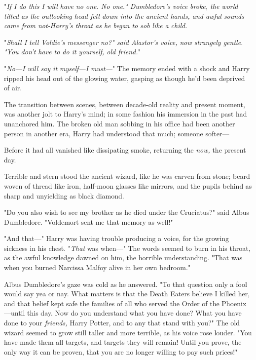 "\emph{If I do this I will have no one. No one." Dumbledore's voice broke, the 
world tilted as the outlooking head fell down into the ancient hands, and awful 
sounds came from not-Harry's throat as he began to sob like a child.}

"\emph{Shall I tell Voldie's messenger no?" said Alastor's voice, now strangely 
gentle. "You don't have to do it yourself, old friend.}"

"\emph{No---I will say it myself---I must---}"
\sbreak
The memory ended with a shock and Harry ripped his head out of the glowing 
water, gasping as though he'd been deprived of air.

The transition between scenes, between decade-old reality and present moment, 
was another jolt to Harry's mind; in some fashion his immersion in the past had 
unanchored him. The broken old man sobbing in his office had been another 
person in another era, Harry had understood that much; someone softer---

Before it had all vanished like dissipating smoke, returning the \emph{now,} 
the present day.

Terrible and stern stood the ancient wizard, like he was carven from stone; 
beard woven of thread like iron, half-moon glasses like mirrors, and the pupils 
behind as sharp and unyielding as black diamond.

"Do you also wish to see my brother as he died under the Cruciatus?" said Albus 
Dumbledore. "Voldemort sent me that memory as well!"

"And that---" Harry was having trouble producing a voice, for the growing 
sickness in his chest. "\emph{That} was when---" The words seemed to burn in 
his throat, as the awful knowledge dawned on him, the horrible understanding. 
"That was when you burned Narcissa Malfoy alive in her own bedroom."

Albus Dumbledore's gaze was cold as he answered. "To that question only a fool 
would say yea or nay. What matters is that the Death Eaters believe I killed 
her, and that belief kept safe the families of all who served the Order of the 
Phoenix---until this day. Now do you understand what you have done? What you 
have done to your \emph{friends,} Harry Potter, and to any that stand with 
you?" The old wizard seemed to grow still taller and more terrible, as his 
voice rose louder. "You have made them all targets, and targets they will 
remain! Until you prove, the only way it can be proven, that you are no longer 
willing to pay such prices!"

